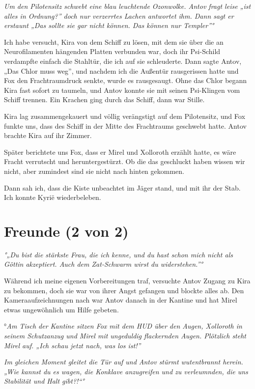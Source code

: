 \documentclass[11pt]{scrartcl}
\begin{document}
\emph{Um den Pilotensitz schwebt eine blau leuchtende Ozonwolke. Antov
fragt leise „ist alles in Ordnung?'' doch nur verzerrtes Lachen
antwortet ihm. Dann sagt er erstaunt „Das sollte sie gar nicht können.
Das können nur Templer''°}

Ich habe versucht, Kira von dem Schiff zu lösen, mit dem sie über die an
Neurofilamenten hängenden Platten verbunden war, doch ihr Psi-Schild
verdampfte einfach die Stahltür, die ich auf sie schleuderte. Dann sagte
Antov, „Das Chlor muss weg'', und nachdem ich die Außentür rausgerissen
hatte und Fox den Frachtraumdruck senkte, wurde es rausgesaugt. Ohne das
Chlor begann Kira fast sofort zu taumeln, und Antov konnte sie mit
seinen Psi-Klingen vom Schiff trennen. Ein Krachen ging durch das
Schiff, dann war Stille.

Kira lag zusammengekauert und völlig verängstigt auf dem Pilotensitz,
und Fox funkte uns, dass des Schiff in der Mitte des Frachtraums
geschwebt hatte. Antov brachte Kira auf ihr Zimmer.

Später berichtete uns Fox, dass er Mirel und Xolloroth erzählt hatte, es
wäre Fracht verrutscht und heruntergestürzt. Ob die das geschluckt haben
wissen wir nicht, aber zumindest sind sie nicht nach hinten gekommen.

Dann sah ich, dass die Kiste unbeachtet im Jäger stand, und mit ihr der
Stab. Ich konnte Kyrië wiederbeleben.

\section{Freunde (2 von 2)}

\emph{°„Du bist die stärkste Frau, die ich kenne, und du hast schon mich
nicht als Göttin akzeptiert. Auch dem Zat-Schwarm wirst du
widerstehen.''°}

Während ich meine eigenen Vorbereitungen traf, versuchte Antov Zugang zu
Kira zu bekommen, doch sie war von ihrer Angst gefangen und blockte
alles ab. Den Kameraaufzeichnungen nach war Antov danach in der Kantine
und hat Mirel etwas ungewöhnlich um Hilfe gebeten.

°\emph{Am Tisch der Kantine sitzen Fox mit dem HUD über den Augen,
Xolloroth in seinem Schutzanzug und Mirel mit ungeduldig flackernden
Augen. Plötzlich steht Mirel auf. „Ich schau jetzt nach, was los ist!''}

\emph{Im gleichen Moment gleitet die Tür auf und Antov stürmt
wutentbrannt herein. „Wie kannst du es wagen, die Konklave anzugreifen
und zu verleumnden, die uns Stabilität und Halt gibt?!``°}
\end{document}
